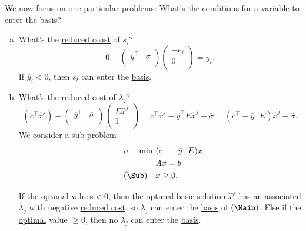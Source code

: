 \begin{prev}
	We now focus on one particular problems: What's the conditions for a variable to enter the \hyperref[def:basis]{basis}?
	\begin{enumerate}[(a)]
		\item What's the \hyperref[def:reduced-cost]{reduced coast} of \(s_{i}\)?
		      \[
			      0 - \begin{pmatrix}
				      \overline{y}^{\top} & \overline{\sigma} \\
			      \end{pmatrix}\begin{pmatrix}
				      -e_{i} \\
				      0      \\
			      \end{pmatrix} = \overline{y}_i.
		      \]
		      If \(\overline{y}_i<0\), then \(s_{i}\) can enter the \hyperref[def:basis]{basis}.
		\item What's the \hyperref[def:reduced-cost]{reduced cost} of \(\lambda_{j}\)?
		      \[
			      (c^{\top}\hat{x}^j) - \begin{pmatrix}
				      \overline{y}^{\top} & \overline{\sigma} \\
			      \end{pmatrix}\begin{pmatrix}
				      E\hat{x}^j \\
				      1          \\
			      \end{pmatrix} = c^{\top}\hat{x}^j - \hat{y}^{\top}E\hat{x}^j - \overline{\sigma} = (c^{\top} - \overline{y}^{\top}E)\hat{x}^j - \overline{\sigma}.
		      \]
		      We consider a sub problem
		      \[
			      \begin{aligned}
				      -\sigma + \min~ & (c^{\top} - \overline{y}^{\top}E)x \\
				                      & Ax = b                             \\
				      (\Sub)\quad     & x\geq 0.
			      \end{aligned}
		      \]

		      If the \hyperref[def:optimal-solution]{optimal} values\(<0\), then the \hyperref[def:optimal-solution]{optimal} \hyperref[def:basic-solution]{basic solution} \(\hat{x}^j\) has an associated \(\lambda_{j}\) with negative \hyperref[def:reduced-cost]{reduced cost}, so \(\lambda_{j}\) can enter the \hyperref[def:basis]{basis} of \((\Main)\). Else if the \hyperref[def:optimal-solution]{optimal} value \(\geq 0\), then no \(\lambda_{j}\) can enter the \hyperref[def:basis]{basis}.


\end{enumerate}
\end{prev}
